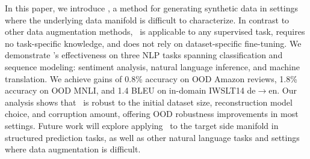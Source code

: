 In this paper, we introduce \ssmba, a method for generating synthetic data in settings where the underlying data manifold is difficult to characterize.
In contrast to other data augmentation methods, \ssmba\ is applicable to any supervised task, requires no task-specific knowledge, and does not rely on dataset-specific fine-tuning.
We demonstrate \ssmba's effectiveness on three NLP tasks spanning classification and sequence modeling: sentiment analysis, natural language inference, and machine translation.
We achieve gains of 0.8\% accuracy on OOD Amazon reviews, 1.8\% accuracy on OOD MNLI, and 1.4 BLEU on in-domain IWSLT14 de$\to$en.
Our analysis shows that \ssmba\ is robust to the initial dataset size, reconstruction model choice, and corruption amount, offering OOD robustness improvements in most settings.
Future work will explore applying \ssmba\ to the target side manifold in structured prediction tasks, as well as other natural language tasks and settings where data augmentation is difficult.